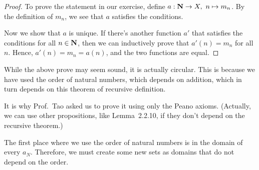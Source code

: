 \begin{proof}
	To prove the statement in our exercise, define $a: \mathbf{N} \to X,\ n \mapsto m_n$. By the definition of $m_n$, we see that $a$ satisfies the conditions. 
	
	Now we show that $a$ is unique. If there's another function $a'$ that satisfies the conditions for all $n \in \mathbf{N}$, then we can inductively prove that $a'(n) = m_n$ for all $n$. Hence, $a'(n) = m_n = a(n)$, and the two functions are equal.
\end{proof}

While the above prove may seem sound, it is actually circular. This is because we have used the order of natural numbers, which depends on addition, which in turn depends on this theorem of recursive definition.

It is why Prof.~Tao asked us to prove it using only the Peano axioms. (Actually, we can use other propositions, like Lemma~2.2.10, if they don't depend on the recursive theorem.)

\noindent{}
The first place where we use the order of natural numbers is in the domain of every $a_N$. Therefore, we must create some new sets as domains that do not depend on the order.

